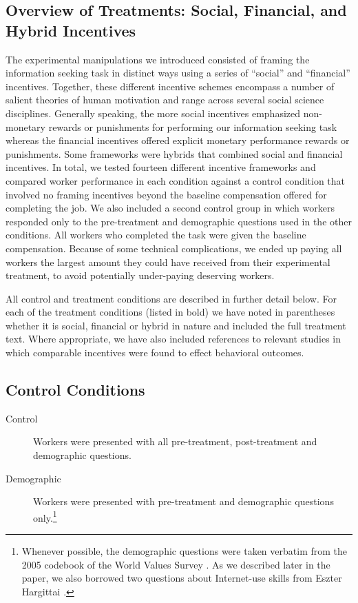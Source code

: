 \documentclass{chi2009}
\begin{document}
\subsection{Overview of Treatments: Social, Financial, and Hybrid Incentives}

The experimental manipulations we introduced consisted of framing the
information seeking task in distinct ways using a series of ``social''
and ``financial'' incentives. Together, these different incentive
schemes encompass a number of salient theories of human motivation and
range across several social science disciplines. Generally speaking,
the more social incentives emphasized non-monetary rewards or
punishments for performing our information seeking task whereas the
financial incentives offered explicit monetary performance rewards or
punishments. Some frameworks were hybrids that combined social and
financial incentives. In total, we tested fourteen different incentive
frameworks and compared worker performance in each condition against a
control condition that involved no framing incentives beyond the
baseline compensation offered for completing the job. We also included
a second control group in which workers responded only to the
pre-treatment and demographic questions used in the other
conditions. All workers who completed the task were given the baseline
compensation. Because of some technical complications, we ended up
paying all workers the largest amount they could have received from
their experimental treatment, to avoid potentially under-paying
deserving workers.

All control and treatment conditions are described in further detail
below. For each of the treatment conditions (listed in bold) we have
noted in parentheses whether it is social, financial or hybrid in
nature and included the full treatment text. Where appropriate, we
have also included references to relevant studies in which comparable
incentives were found to effect behavioral outcomes.

\subsection{Control Conditions} 

\begin{description}
\item[Control] Workers were presented with all pre-treatment, post-treatment and demographic questions.
\item[Demographic] Workers were presented with pre-treatment and demographic questions only.\footnote{Whenever possible, the demographic questions were taken verbatim from the 2005 codebook of the World Values Survey \cite{world_vals_survey2009}. As we described later in the paper, we also borrowed two questions about Internet-use skills from Eszter Hargittai \cite{hargittai2009update}.}
\end{description}
\end{document}
